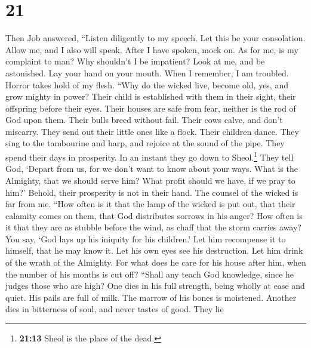\hypertarget{section-20}{%
\section{21}\label{section-20}}

 Then Job answered,  ``Listen diligently to
my speech. Let this be your consolation.  Allow me, and I
also will speak. After I have spoken, mock on.  As for me,
is my complaint to man? Why shouldn't I be impatient? 
Look at me, and be astonished. Lay your hand on your mouth.
 When I remember, I am troubled. Horror takes hold of my
flesh.  ``Why do the wicked live, become old, yes, and
grow mighty in power?  Their child is established with
them in their sight, their offspring before their eyes. 
Their houses are safe from fear, neither is the rod of God upon them.
 Their bulls breed without fail. Their cows calve, and
don't miscarry.  They send out their little ones like a
flock. Their children dance.  They sing to the tambourine
and harp, and rejoice at the sound of the pipe.  They
spend their days in prosperity. In an instant they go down to
Sheol.\footnote{\textbf{21:13} Sheol is the place of the dead.}
 They tell God, `Depart from us, for we don't want to
know about your ways.  What is the Almighty, that we
should serve him? What profit should we have, if we pray to him?'
 Behold, their prosperity is not in their hand. The
counsel of the wicked is far from me.  ``How often is it
that the lamp of the wicked is put out, that their calamity comes on
them, that God distributes sorrows in his anger?  How
often is it that they are as stubble before the wind, as chaff that the
storm carries away?  You say, `God lays up his iniquity
for his children.' Let him recompense it to himself, that he may know
it.  Let his own eyes see his destruction. Let him drink
of the wrath of the Almighty.  For what does he care for
his house after him, when the number of his months is cut off?
 ``Shall any teach God knowledge, since he judges those
who are high?  One dies in his full strength, being
wholly at ease and quiet.  His pails are full of milk.
The marrow of his bones is moistened.  Another dies in
bitterness of soul, and never tastes of good.  They lie
